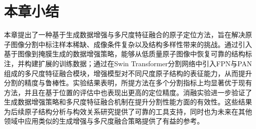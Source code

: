 \section{本章小结}
本章提出了一种基于生成数据增强与多尺度特征融合的原子定位方法，旨在解决原子图像分割中标注样本稀缺、成像条件复杂以及结构多样性带来的挑战。通过引入基于图像到掩膜生成的数据增强策略，能够从低质量原子图像中恢复可靠的结构标注，并构建扩展的训练数据；通过在Swin Transformer分割网络中引入FPN与PAN组成的多尺度特征融合模块，增强模型对不同尺度原子结构的表征能力，从而提升分割的精度与鲁棒性。实验结果表明，所提方法在多个分割指标上均显著优于现有方法，并且在基于位置的评估中也表现出更高的定位精度。消融实验进一步验证了生成数据增强策略和多尺度特征融合机制在提升分割性能方面的有效性。这些结果为后续原子结构分析与构效关系研究提供了可靠的工具支持，同时也为未来在其他领域中应用类似的生成增强与多尺度融合策略提供了有益的参考。


